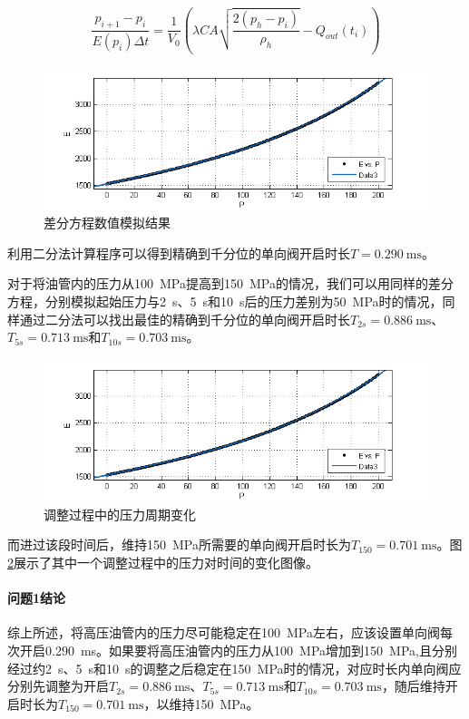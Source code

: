 \documentclass[12pt,AutoFakeBold]{article}%
\begin{document}
    \begin{equation}
        \frac{p_{i+1}-p_i}{E(p_i)\Delta t}=\frac{1}{V_0}\left(\lambda CA\sqrt{\frac{2\left(p_h-p_i\right)}{\rho_h}}-Q_{out}(t_i)\right)
    \end{equation}
    \begin{figure}[H]
        \centering
        \includegraphics[scale=0.8]{figure/data3.png}%
        \caption{差分方程数值模拟结果}
        \label{ptfigure1}
    \end{figure}
    利用二分法计算程序可以得到精确到千分位的单向阀开启时长$T=\SI{0.290}{\ms}$。\par
    对于将油管内的压力从\SI{100}{\MPa}提高到\SI{150}{\MPa}的情况，我们可以用同样的差分方程，分别模拟起始压力与\SI{2}{\s}、\SI{5}{\s}和\SI{10}{\s}后的压力差别为\SI{50}{\MPa}时的情况，同样通过二分法可以找出最佳的精确到千分位的单向阀开启时长$T_{2s}=\SI{0.886}{\ms}$、$T_{5s}=\SI{0.713}{\ms}$和$T_{10s}=\SI{0.703}{\ms}$。\par
    \begin{figure}[H]
        \centering
        \includegraphics[scale=0.8]{figure/data3.png}
        \caption{调整过程中的压力周期变化}
        \label{adjustpress}
    \end{figure}
    而进过该段时间后，维持\SI{150}{\MPa}所需要的单向阀开启时长为$T_{150}=\SI{0.701}{\ms}$。图\ref{adjustpress}展示了其中一个调整过程中的压力对时间的变化图像。\par
    \paragraph{问题1结论}
    综上所述，将高压油管内的压力尽可能稳定在\SI{100}{\MPa}左右，应该设置单向阀每次开启\SI{0.290}{\ms}。如果要将高压油管内的压力从\SI{100}{\MPa}增加到\SI{150}{\MPa},且分别经过约\SI{2}{\s}、\SI{5}{\s}和\SI{10}{\s}的调整之后稳定在\SI{150}{\MPa}时的情况，对应时长内单向阀应分别先调整为开启$T_{2s}=\SI{0.886}{\ms}$、$T_{5s}=\SI{0.713}{\ms}$和$T_{10s}=\SI{0.703}{\ms}$，随后维持开启时长为$T_{150}=\SI{0.701}{\ms}$，以维持\SI{150}{\MPa}。\par
    
\end{document}
